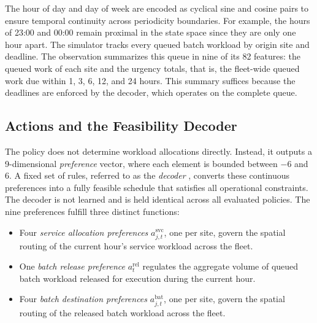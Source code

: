 \documentclass{UNCC-thesis}
\begin{document}
The hour of day and day of week are encoded as cyclical sine and cosine pairs to ensure
temporal continuity across periodicity boundaries. For example, the hours of 23:00 and 00:00
remain proximal in the state space since they are only one hour apart. The simulator tracks
every queued batch workload by origin site and deadline. The observation summarizes this queue
in nine of its 82 features: the queued work of each site and the urgency totals, that is, the
fleet-wide queued work due within 1, 3, 6, 12, and 24 hours. This summary suffices because the
deadlines are enforced by the decoder, which operates on the complete queue.

\subsection{Actions and the Feasibility Decoder}
\label{sec:method-actions}

The policy does not determine workload allocations directly. Instead, it outputs a
9-dimensional \emph{preference} vector, where each element is bounded between \(-6\) and 6.
A fixed set of rules, referred to as the \emph{decoder} \cite{koziel1999homomorphous}, converts these continuous
preferences into a fully feasible schedule that satisfies all operational constraints. The
decoder is not learned and is held identical across all evaluated policies. The nine
preferences fulfill three distinct functions:
\begin{itemize}
  \item Four \emph{service allocation preferences} \(a^{\mathrm{svc}}_{j,t}\), one per
        site, govern the spatial routing of the current hour's service workload across the
        fleet.
  \item One \emph{batch release preference} \(a^{\mathrm{rel}}_t\) regulates the aggregate
        volume of queued batch workload released for execution during the current hour.
  \item Four \emph{batch destination preferences} \(a^{\mathrm{bat}}_{j,t}\), one per site,
        govern the spatial routing of the released batch workload across the fleet.
\end{itemize}
\end{document}
